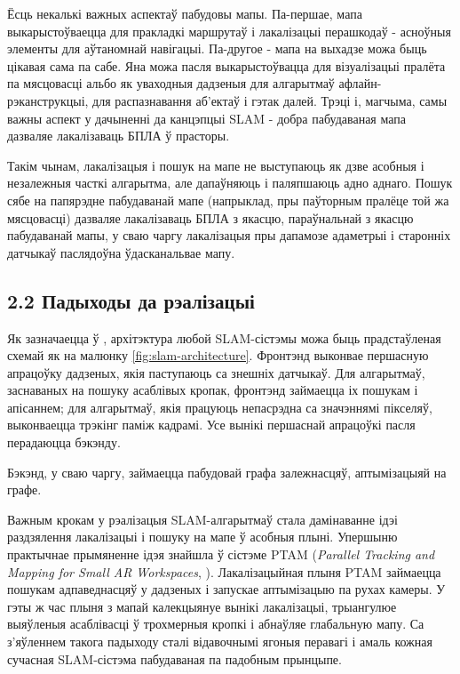 Ёсць некалькі важных аспектаў пабудовы мапы. Па-першае, мапа выкарыстоўваецца для пракладкі
маршрутаў і лакалізацыі перашкодаў - асноўныя элементы для аўтаномнай навігацыі. Па-другое -
мапа на выхадзе можа быць цікавая сама па сабе. Яна можа пасля выкарыстоўвацца для візуалізацыі пралёта
па мясцовасці альбо як уваходныя дадзеныя для алгарытмаў афлайн-рэканструкцыі, для распазнавання
аб'ектаў і гэтак далей. Трэці і, магчыма, самы важны аспект у дачыненні да канцэпцыі SLAM -
добра пабудаваная мапа дазваляе лакалізаваць БПЛА ў прасторы.

Такім чынам, лакалізацыя і пошук на мапе не выступаюць як дзве асобныя і незалежныя
часткі алгарытма, але дапаўняюць і паляпшаюць адно аднаго. Пошук сябе на папярэдне пабудаванай мапе
(напрыклад, пры паўторным пралёце той жа мясцовасці) дазваляе лакалізаваць БПЛА з
якасцю, параўнальнай з якасцю пабудаванай мапы, у сваю чаргу лакалізацыя пры дапамозе
адаметрыі і старонніх датчыкаў паслядоўна ўдасканальвае мапу.

\subsection*{2.2 Падыходы да рэалізацыі}

Як зазначаецца ў \cite{Li2016RealtimeSL}, архітэктура любой SLAM-сістэмы
можа быць прадстаўленая схемай як на малюнку \ref{fig:slam-architecture}. Фронтэнд выконвае
першасную апрацоўку дадзеных, якія паступаюць са знешніх датчыкаў. Для алгарытмаў,
заснаваных на пошуку асаблівых кропак, фронтэнд займаецца іх пошукам і апісаннем;
для алгарытмаў, якія працуюць непасрэдна са значэннямі пікселяў, выконваецца трэкінг паміж
кадрамі. Усе вынікі першаснай апрацоўкі пасля перадаюцца бэкэнду.

Бэкэнд, у сваю чаргу, займаецца пабудовай графа залежнасцяў, аптымізацыяй на графе.

Важным крокам у рэалізацыя SLAM-алгарытмаў стала дамінаванне ідэі раздзялення лакалізацыі
і пошуку на мапе ў асобныя плыні. Упершыню практычнае прымяненне ідэя знайшла
ў сістэме PTAM (\textit{Parallel Tracking and Mapping for Small AR Workspaces}, \cite{Klein:2007:PTM:1514339.1514363}).
Лакалізацыйная плыня PTAM займаецца пошукам адпаведнасцяў у дадзеных і запускае
аптымізацыю па рухах камеры. У гэты ж час плыня з мапай калекцыянуе вынікі лакалізацыі,
трыангулюе выяўленыя асаблівасці ў трохмерныя кропкі і абнаўляе глабальную мапу.
Са з'яўленнем такога падыходу сталі відавочнымі ягоныя перавагі і амаль кожная
сучасная SLAM-сістэма пабудаваная па падобным прынцыпе.

